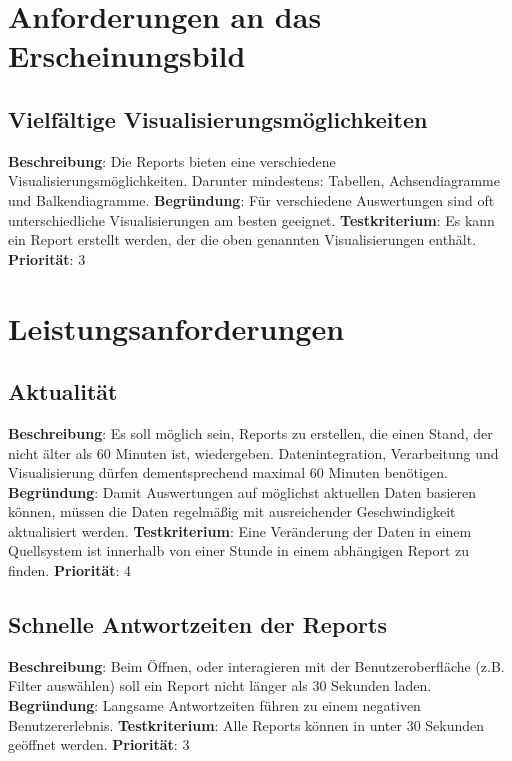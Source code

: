 \section{Anforderungen an das Erscheinungsbild} \label{sec:anforderungsspezifikation:erscheinungsbild}

\subsection{Vielfältige Visualisierungsmöglichkeiten} \label{sec:anforderungsspezifikation:vielfältigeVisualisierungsmöglichkeiten}
\textbf{Beschreibung}: Die Reports bieten eine verschiedene Visualisierungsmöglichkeiten. Darunter mindestens: Tabellen, Achsendiagramme und Balkendiagramme.
\newline \textbf{Begründung}: Für verschiedene Auswertungen sind oft unterschiedliche Visualisierungen am besten geeignet.
\newline \textbf{Testkriterium}: Es kann ein Report erstellt werden, der die oben genannten Visualisierungen enthält.
\newline \textbf{Priorität}: 3

\section{Leistungsanforderungen}  \label{sec:anforderungsspezifikation:leistungsanforderungen}

\subsection{Aktualität} \label{sec:anforderungsspezifikation:aktualität}
\textbf{Beschreibung}: Es soll möglich sein, Reports zu erstellen, die einen Stand, der nicht älter als 60 Minuten ist, wiedergeben. Datenintegration, Verarbeitung und Visualisierung dürfen dementsprechend maximal 60 Minuten benötigen.
\newline \textbf{Begründung}: Damit Auswertungen auf möglichst aktuellen Daten basieren können, müssen die Daten regelmäßig mit ausreichender Geschwindigkeit aktualisiert werden. 
\newline \textbf{Testkriterium}: Eine Veränderung der Daten in einem Quellsystem ist innerhalb von einer Stunde in einem abhängigen Report zu finden.
\newline \textbf{Priorität}: 4

\subsection{Schnelle Antwortzeiten der Reports} \label{sec:anforderungsspezifikation:schnelleAntwortzeitenDerReports}
\textbf{Beschreibung}: Beim Öffnen, oder interagieren mit der Benutzeroberfläche (z.B. Filter auswählen) soll ein Report nicht länger als 30 Sekunden laden.
\newline \textbf{Begründung}: Langsame Antwortzeiten führen zu einem negativen Benutzererlebnis.
\newline \textbf{Testkriterium}: Alle Reports können in unter 30 Sekunden geöffnet werden.
\newline \textbf{Priorität}: 3

